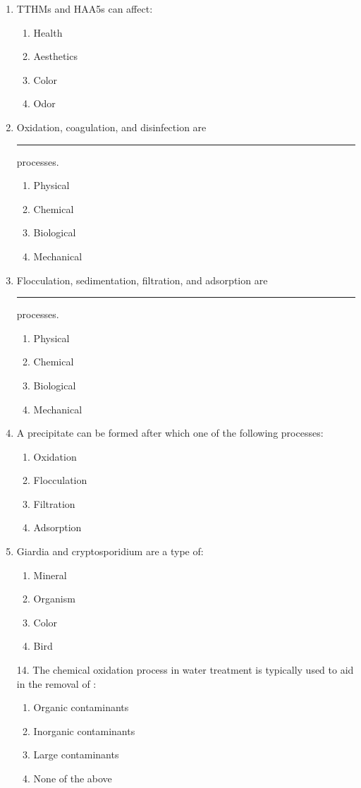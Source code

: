 \begin{enumerate}
\item TTHMs and HAA5s can affect:
\begin{enumerate}
\item Health
\item Aesthetics
\item Color
\item Odor
\end{enumerate}

\item Oxidation, coagulation, and disinfection are \rule{1cm}{0.5pt}  processes.
\begin{enumerate}
\item Physical
\item Chemical
\item Biological
\item Mechanical
\end{enumerate}

\item Flocculation, sedimentation, filtration, and adsorption are \rule{1cm}{0.5pt} processes.
\begin{enumerate}
\item Physical
\item Chemical
\item Biological
\item Mechanical
\end{enumerate}

\item A precipitate can be formed after which one of the following processes:
\begin{enumerate}
\item Oxidation
\item Flocculation
\item Filtration
\item Adsorption
\end{enumerate}

\item Giardia and cryptosporidium are a type of:
\begin{enumerate}
\item Mineral
\item Organism
\item Color
\item Bird
\end{enumerate}

14. The chemical oxidation process in water treatment is typically used to aid in the
removal of :
\begin{enumerate}
\item Organic contaminants
\item Inorganic contaminants
\item Large contaminants
\item None of the above
\end{enumerate}


\end{enumerate}
